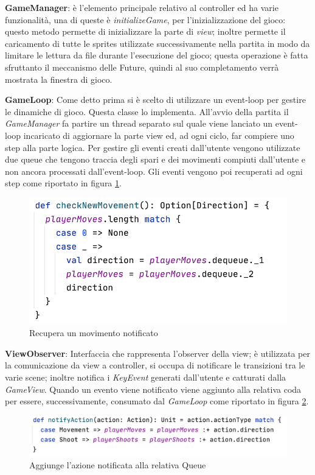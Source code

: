  \textbf{GameManager}: è l'elemento principale relativo al controller ed ha varie funzionalità, una di queste è \textit{initializeGame}, per l'inizializzazione del gioco: questo metodo permette di inizializzare la parte di \textit{view}; inoltre permette il caricamento di tutte le sprites utilizzate successivamente nella partita in modo da limitare le lettura da file durante l'esecuzione del gioco; questa operazione è fatta sfruttanto il meccanismo delle Future, quindi al suo completamento verrà mostrata la finestra di gioco.

\textbf{GameLoop}: Come detto prima si è scelto di utilizzare un event-loop per gestire le dinamiche di gioco. Questa classe lo implementa. All'avvio della partita il \textit{GameManager} fa partire un thread separato sul quale viene lanciato un event-loop incaricato di aggiornare la parte view ed, ad ogni ciclo, far compiere uno step alla parte logica. 
Per gestire gli eventi creati dall'utente vengono utilizzate due queue che tengono traccia degli spari e dei movimenti compiuti dall'utente e non ancora processati dall'event-loop. Gli eventi vengono poi recuperati ad ogni step come riportato in figura \ref{checknewMovement}.

\begin{figure}[H]
  \includegraphics[width=13cm]{res/checkNewMovement.png}
  \caption{Recupera un movimento notificato}
  \label{checknewMovement}
\end{figure}
\textbf{ViewObserver}: Interfaccia che rappresenta l'observer della view; è utilizzata per la comunicazione da view a controller, si occupa di notificare le transizioni tra le varie scene; inoltre notifica i \textit{KeyEvent} generati dall'utente e catturati dalla \textit{GameView}. Quando un evento viene notificato viene aggiunto alla relativa coda per essere, successivamente, consumato dal \textit{GameLoop} come riportato in figura \ref{notifyAction}.
\begin{figure}[H]
  \includegraphics[width=15cm]{res/notifyAction.png}
  \caption{Aggiunge l'azione notificata alla relativa Queue}
  \label{notifyAction}
\end{figure}

